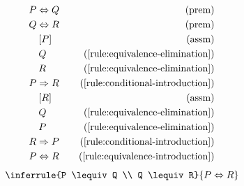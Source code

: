 \begin{align*}
    \premise{P \lequiv Q}\\
    \premise{Q \lequiv R}\\
    \assumption[1]{P}\\
    \byrule[1]{Q}{\ref{rule:equivalence-elimination}}\\
    \byrule[1]{R}{\ref{rule:equivalence-elimination}}\\
    \byrule{P \implies R}{\ref{rule:conditional-introduction}}\\
    \assumption[1]{R}\\
    \byrule[1]{Q}{\ref{rule:equivalence-elimination}}\\
    \byrule[1]{P}{\ref{rule:equivalence-elimination}}\\
    \byrule{R \implies P}{\ref{rule:conditional-introduction}}\\
    \byrule{P \lequiv R}{\ref{rule:equivalence-introduction}}
\end{align*}
\begin{equation}
    \inferrule{P \lequiv Q \\ Q \lequiv R}{P \lequiv R}
    \label{rule:equivalence-transitivity}
\end{equation}

